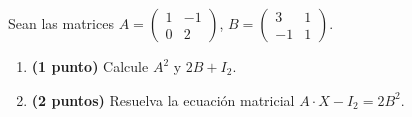 
Sean las matrices $A=\begin{pmatrix}1&-1\\0&2\end{pmatrix}$, $B=\begin{pmatrix}3&1\\-1&1\end{pmatrix}$.
\begin{enumerate}[label=\alph*)]
\item \textbf{(1 punto)} Calcule $A^2$ y $2B+I_2$.
\item \textbf{(2 puntos)} Resuelva la ecuación matricial $A\cdot X-I_2=2B^2$.
\end{enumerate}
